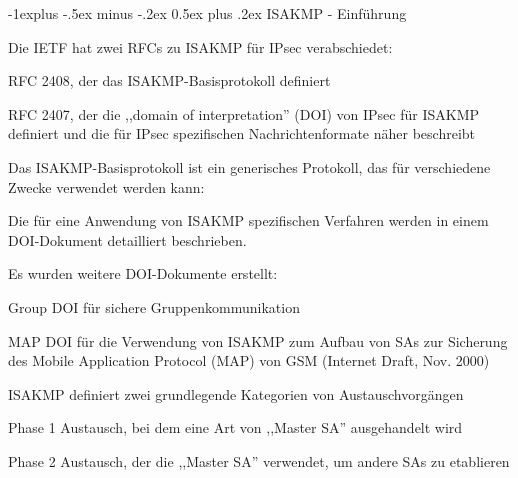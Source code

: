 \documentclass[a4paper]{article}
\makeatletter
\renewcommand{\subsection}{\@startsection{subsection}{2}{0mm}%
 {-1explus -.5ex minus -.2ex}%
 {0.5ex plus .2ex}%
 {\normalfont\normalsize\bfseries}}
\makeatother
\begin{document}
\begin{multicols}{3}
      \subsection{ISAKMP - Einführung}
      \begin{itemize*}
            \item Die IETF hat zwei RFCs zu ISAKMP für IPsec verabschiedet:
            \begin{itemize*}
                  \item RFC 2408, der das ISAKMP-Basisprotokoll definiert
                  \item RFC 2407, der die ,,domain of interpretation'' (DOI) von IPsec für ISAKMP definiert und die für IPsec spezifischen Nachrichtenformate näher beschreibt
            \end{itemize*}
            \item Das ISAKMP-Basisprotokoll ist ein generisches Protokoll, das für verschiedene Zwecke verwendet werden kann:
            \begin{itemize*}
                  \item Die für eine Anwendung von ISAKMP spezifischen Verfahren werden in einem DOI-Dokument detailliert beschrieben.
                  \item Es wurden weitere DOI-Dokumente erstellt:
                  \begin{itemize*}
                        \item Group DOI für sichere Gruppenkommunikation
                        \item MAP DOI für die Verwendung von ISAKMP zum Aufbau von SAs zur Sicherung des Mobile Application Protocol (MAP) von GSM (Internet Draft, Nov. 2000)
                  \end{itemize*}
            \end{itemize*}
            \item ISAKMP definiert zwei grundlegende Kategorien von Austauschvorgängen
            \begin{itemize*}
                  \item Phase 1 Austausch, bei dem eine Art von ,,Master SA'' ausgehandelt wird
                  \item Phase 2 Austausch, der die ,,Master SA'' verwendet, um andere SAs zu etablieren
            \end{itemize*}
      \end{itemize*}


\end{multicols}
\end{document}
